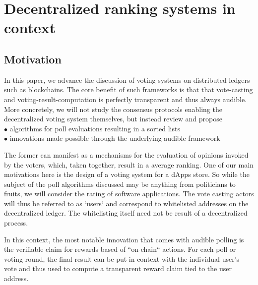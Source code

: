 
\section{Decentralized ranking systems in context}
\subsection{Motivation} 
In this paper, we advance the discussion of voting systems on distributed ledgers such as blockchains. The core benefit of such frameworks is that that vote-casting and voting-result-computation is perfectly transparent and thus always audible.
More concretely, we will not study the consensus protocols enabling the decentralized voting system themselves, but instead review and propose\\
$\bullet$ algorithms for poll evaluations resulting in a sorted lists\\
$\bullet$ innovations made possible through the underlying audible framework

The former can manifest as a mechanisms for the evaluation of opinions invoked by the voters, which, taken together, result in a average ranking. One of our main motivations here is the design of a voting system for a dApps store. So while the subject of the poll algorithms discussed may be anything from politicians to fruits, we will consider the rating of software applications. The vote casting actors will thus be referred to as `users` and correspond to whitelisted addresses on the decentralized ledger. The whitelisting itself need not be result of a decentralized process. 

In this context, the most notable innovation that comes with audible polling is the verifiable claim for rewards based of ``on-chain`` actions. For each poll or voting round, the final result can be put in context with the individual user's vote and thus used to compute a transparent reward claim tied to the user address.
